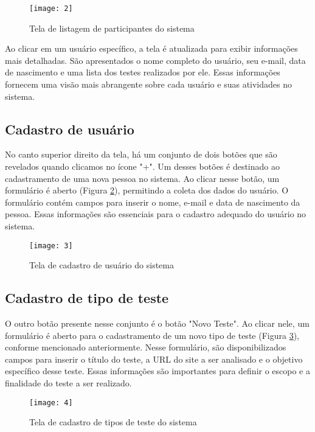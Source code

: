 \begin{figure}[h]
  \caption{Tela de listagem de participantes do sistema}
  \centering
  \texttt{[image: 2]}
  \label{fig:2}
\end{figure}
\FloatBarrier

Ao clicar em um usuário específico, a tela é atualizada para exibir informações mais detalhadas. São apresentados o nome completo do usuário, seu e-mail, data de nascimento e uma lista dos testes realizados por ele. Essas informações fornecem uma visão mais abrangente sobre cada usuário e suas atividades no sistema.

\subsection{Cadastro de usuário}

No canto superior direito da tela, há um conjunto de dois botões que são revelados quando clicamos no ícone "+". Um desses botões é destinado ao cadastramento de uma nova pessoa no sistema. Ao clicar nesse botão, um formulário é aberto (Figura \ref{fig:3}), permitindo a coleta dos dados do usuário. O formulário contém campos para inserir o nome, e-mail e data de nascimento da pessoa. Essas informações são essenciais para o cadastro adequado do usuário no sistema.

\begin{figure}[h]
  \caption{Tela de cadastro de usuário do sistema}
  \centering
  \texttt{[image: 3]}
  \label{fig:3}
\end{figure}
\FloatBarrier

\clearpage
\subsection{Cadastro de tipo de teste}

O outro botão presente nesse conjunto é o botão "Novo Teste". Ao clicar nele, um formulário é aberto para o cadastramento de um novo tipo de teste (Figura \ref{fig:4}), conforme mencionado anteriormente. Nesse formulário, são disponibilizados campos para inserir o título do teste, a URL do site a ser analisado e o objetivo específico desse teste. Essas informações são importantes para definir o escopo e a finalidade do teste a ser realizado.

\begin{figure}[h]
  \caption{Tela de cadastro de tipos de teste do sistema}
  \centering
  \texttt{[image: 4]}
  \label{fig:4}
\end{figure}
\FloatBarrier

